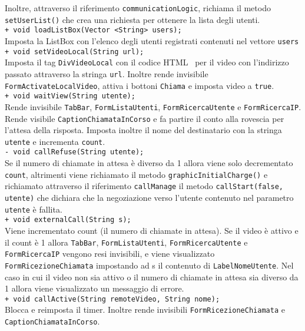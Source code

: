 {\begin{sloppypar}
{\begin{itemize}
\begin{itemize}
				Inoltre, attraverso il riferimento \texttt{communicationLogic}, richiama il metodo \texttt{setUserList()} che crea una richiesta per ottenere la lista degli utenti.\\
				\texttt{+ void loadListBox(Vector <String> users);}\\
				Imposta la ListBox con l’elenco degli utenti registrati contenuti nel vettore \texttt{users}\\
				\texttt{+ void setVideoLocal(String url); }\\
				Imposta il tag \texttt{DivVideoLocal} con il codice HTML\g~ per il video con l’indirizzo passato attraverso la stringa \texttt{url}.
				Inoltre rende invisibile \texttt{FormActivateLocalVideo}, attiva i bottoni \texttt{Chiama} e imposta video a \texttt{true}.\\
				\texttt{+ void waitView(String utente);}\\
				Rende invisibile \texttt{TabBar}, \texttt{FormListaUtenti}, \texttt{FormRicercaUtente} e \texttt{FormRicercaIP}. 
				Rende visibile \texttt{CaptionChiamataInCorso} e fa partire il conto alla rovescia per l’attesa della risposta. 
				Imposta inoltre il nome del destinatario con la stringa \texttt{utente} e incrementa \texttt{count}.\\
				\texttt{- void callRefuse(String utente);}\\
				Se il numero di chiamate in attesa è diverso da 1 allora viene solo decrementato \texttt{count}, altrimenti viene richiamato il metodo \texttt{graphicInitialCharge()} e richiamato attraverso il riferimento \texttt{callManage} il metodo \texttt{callStart(false, utente)} che dichiara che la negoziazione verso l’utente contenuto nel parametro \texttt{utente} è fallita.\\
				\texttt{+ void externalCall(String s);}\\
				Viene incrementato count (il numero di chiamate in attesa). Se il video è attivo e il count è 1 allora 
				\texttt{TabBar}, \texttt{FormListaUtenti}, \texttt{FormRicercaUtente} e \texttt{FormRicercaIP} vengono resi 
				invisibili, e viene visualizzato \texttt{FormRicezioneChiamata} impostando ad s il contenuto di \texttt{LabelNomeUtente}. 
				Nel caso in cui il video non sia attivo o il numero di chiamate in attesa sia diverso da 1 allora viene 
				visualizzato un messaggio di errore.\\
				\texttt{+ void callActive(String remoteVideo, String nome);}\\
				Blocca e reimposta il timer. Inoltre rende invisibili \texttt{FormRicezioneChiamata} e \texttt{CaptionChiamataInCorso}. 

\end{itemize}
\end{itemize}}
\end{sloppypar}}

